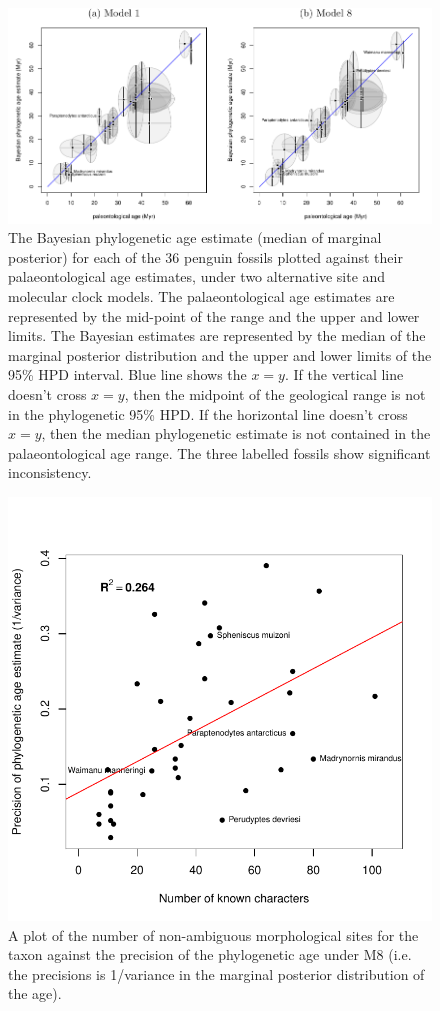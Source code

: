 \documentclass[11pt]{article}
\newcommand{\Mrelaxed}{{M8}}
\begin{document}
\begin{figure}
\includegraphics{Figure1.pdf}
\caption{\label{fig:phyloAgeVsGeoAge}
The Bayesian phylogenetic age estimate (median of marginal posterior) for each of the 36 penguin fossils plotted against their palaeontological age estimates, under two alternative site and molecular clock models. The palaeontological age estimates are represented by the mid-point of the range and the upper and lower limits. The Bayesian estimates are represented by the median of the marginal posterior distribution and the upper and lower limits of the 95\% HPD interval. Blue line shows the $x=y$. If the vertical line doesn't cross $x=y$, then the midpoint of the geological range is not in the phylogenetic 95\% HPD. If the horizontal line doesn't cross $x=y$, then the median phylogenetic estimate is not contained in the palaeontological age range. The three labelled fossils show significant inconsistency.}
\end{figure}

\begin{figure}
\includegraphics[width=5in]{run8_5/8_precisionVsKnownCharacters.pdf}
\caption{A plot of the number of non-ambiguous morphological sites for the taxon against the precision of the phylogenetic age under \Mrelaxed{} (i.e. the precisions is 1/variance in the marginal posterior distribution of the age).}
\end{figure}
\end{document}

